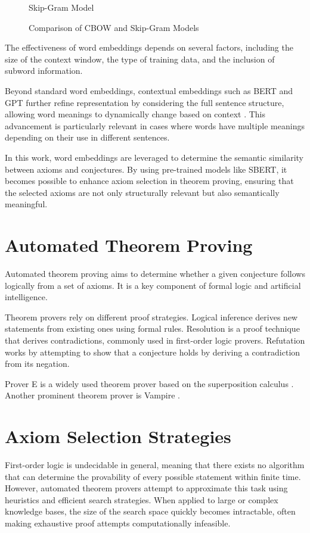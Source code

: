 \documentclass[english,version-2020-11]{uzl-thesis}
\begin{document}
\begin{figure}[h]
\begin{subcaptionblock}{0.45\textwidth}
        \caption{Skip-Gram Model}
    \end{subcaptionblock}
    \caption{Comparison of CBOW and Skip-Gram Models}
\end{figure}


The effectiveness of word embeddings depends on several factors, including the size of the context window, the type of training data, and the inclusion of subword information.

Beyond standard word embeddings, contextual embeddings such as BERT and GPT further refine representation by considering the full sentence structure, allowing word meanings to dynamically change based on context \cite{Devlin2019}. This advancement is particularly relevant in cases where words have multiple meanings depending on their use in different sentences.

In this work, word embeddings are leveraged to determine the semantic similarity between axioms and conjectures. By using pre-trained models like SBERT, it becomes possible to enhance axiom selection in theorem proving, ensuring that the selected axioms are not only structurally relevant but also semantically meaningful.

\section{Automated Theorem Proving}

Automated theorem proving aims to determine whether a given conjecture follows logically from a set of axioms. It is a key component of formal logic and artificial intelligence.

Theorem provers rely on different proof strategies. Logical inference derives new statements from existing ones using formal rules. Resolution is a proof technique that derives contradictions, commonly used in first-order logic provers. Refutation works by attempting to show that a conjecture holds by deriving a contradiction from its negation.

Prover E is a widely used theorem prover based on the superposition calculus \cite{Schulz2019}. Another prominent theorem prover is Vampire \cite{Riazanov2002}.

\section{Axiom Selection Strategies}

First-order logic is undecidable in general, meaning that there exists no algorithm that can determine the provability of every possible statement within finite time. However, automated theorem provers attempt to approximate this task using heuristics and efficient search strategies. When applied to large or complex knowledge bases, the size of the search space quickly becomes intractable, often making exhaustive proof attempts computationally infeasible.
\end{document}

